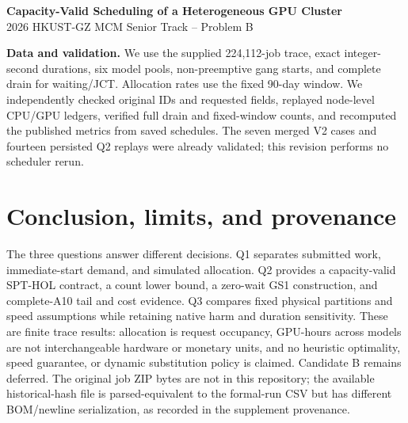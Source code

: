 

\begin{center}
{\Large\bfseries\color{primary} Capacity-Valid Scheduling of a Heterogeneous GPU Cluster}\\[3pt]
{\large 2026 HKUST-GZ MCM Senior Track -- Problem B}\\[5pt]
\end{center}
\textbf{Data and validation.} We use the supplied 224,112-job trace, exact integer-second durations, six model pools, non-preemptive gang starts, and complete drain for waiting/JCT. Allocation rates use the fixed 90-day window. We independently checked original IDs and requested fields, replayed node-level CPU/GPU ledgers, verified full drain and fixed-window counts, and recomputed the published metrics from saved schedules. The seven merged V2 cases and fourteen persisted Q2 replays were already validated; this revision performs no scheduler rerun.





\section{Conclusion, limits, and provenance}
The three questions answer different decisions. Q1 separates submitted work, immediate-start demand, and simulated allocation. Q2 provides a capacity-valid SPT-HOL contract, a count lower bound, a zero-wait GS1 construction, and complete-A10 tail and cost evidence. Q3 compares fixed physical partitions and speed assumptions while retaining native harm and duration sensitivity. These are finite trace results: allocation is request occupancy, GPU-hours across models are not interchangeable hardware or monetary units, and no heuristic optimality, speed guarantee, or dynamic substitution policy is claimed. Candidate B remains deferred. The original job ZIP bytes are not in this repository; the available historical-hash file is parsed-equivalent to the formal-run CSV but has different BOM/newline serialization, as recorded in the supplement provenance.


